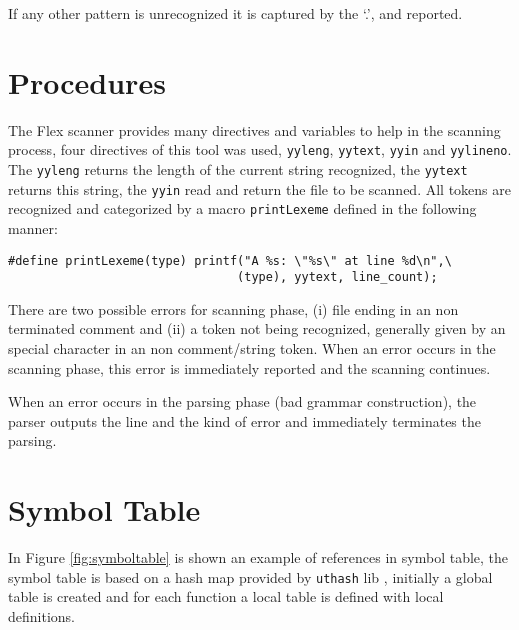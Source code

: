 \documentclass{article}
\begin{document}
If any other pattern is unrecognized it is captured by the `.', and reported.

\section{Procedures}
\label{sec:proc}
The Flex scanner provides many directives and variables to help in the scanning
process, four directives of this tool was used, \texttt{yyleng},
\texttt{yytext}, \texttt{yyin} and \texttt{yylineno}. The \texttt{yyleng}
returns the length of the current string recognized, the \texttt{yytext}
returns this string, the \texttt{yyin} read and return the file to be scanned.
All tokens are recognized and categorized by a macro \texttt{printLexeme}
defined in the following manner:

\begin{verbatim}
#define printLexeme(type) printf("A %s: \"%s\" at line %d\n",\
                                (type), yytext, line_count);
\end{verbatim}

There are two possible errors for scanning phase, (i) file ending in an
non terminated comment and (ii) a token not being recognized, generally given by
an special character in an non comment/string token. When an error occurs in the
scanning phase, this error is immediately reported and the scanning continues.

When an error occurs in the parsing phase (bad grammar construction), the
parser outputs the line and the kind of error and immediately terminates the
parsing.

\section{Symbol Table}
\label{sec:symtable}
In Figure \ref{fig:symboltable} is shown an example of references in symbol
table, the symbol table is based on a hash map provided by \texttt{uthash} lib
\cite{hanson2013uthash}, initially a global table is created and for each
function a local table is defined with local definitions.
\end{document}
